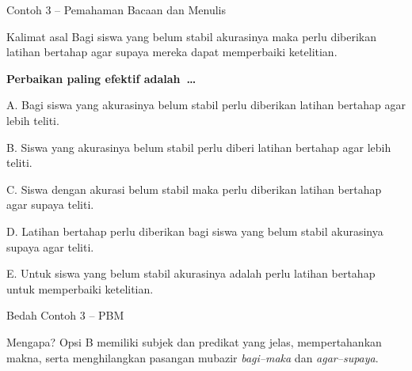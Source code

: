 \begin{frame}[shrink=8]{Contoh 3 -- Pemahaman Bacaan dan Menulis}
  \begin{block}{Kalimat asal}
    Bagi siswa yang belum stabil akurasinya maka perlu diberikan latihan bertahap agar supaya mereka dapat memperbaiki ketelitian.
  \end{block}
  {\bfseries Perbaikan paling efektif adalah~\ldots}\par
  \vspace{0.08cm}
  {\fontsize{9.65}{11.9}\selectfont
  A. Bagi siswa yang akurasinya belum stabil perlu diberikan latihan bertahap agar lebih teliti.\par\vspace{0.06cm}
  B. Siswa yang akurasinya belum stabil perlu diberi latihan bertahap agar lebih teliti.\par\vspace{0.06cm}
  C. Siswa dengan akurasi belum stabil maka perlu diberikan latihan bertahap agar supaya teliti.\par\vspace{0.06cm}
  D. Latihan bertahap perlu diberikan bagi siswa yang belum stabil akurasinya supaya agar teliti.\par\vspace{0.06cm}
  E. Untuk siswa yang belum stabil akurasinya adalah perlu latihan bertahap untuk memperbaiki ketelitian.}
\end{frame}

\begin{frame}{Bedah Contoh 3 -- PBM}
  \vspace{0.22cm}
  \begin{block}{Mengapa?}
    Opsi B memiliki subjek dan predikat yang jelas, mempertahankan makna, serta menghilangkan pasangan mubazir \emph{bagi--maka} dan \emph{agar--supaya}.
  \end{block}
  {\fontsize{10.6}{13.2}\selectfont
  \par\vspace{0.16cm}
  }
\end{frame}

